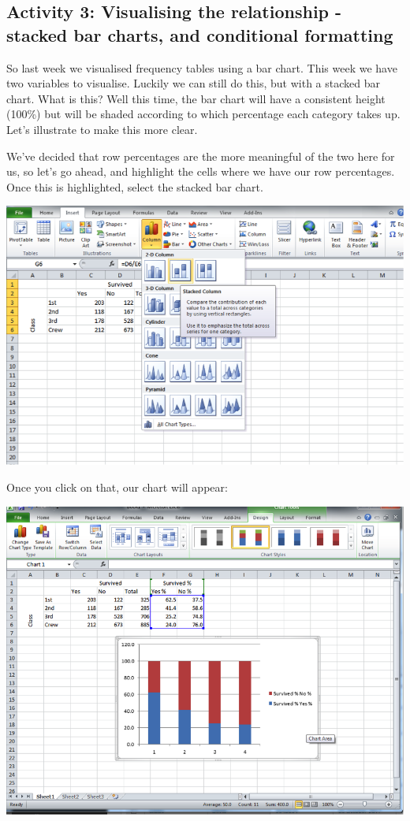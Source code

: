 \documentclass[]{book}
\theoremstyle{definition}
\theoremstyle{definition}
\theoremstyle{definition}
\theoremstyle{remark}
\begin{document}
\hypertarget{activity-3-visualising-the-relationship---stacked-bar-charts-and-conditional-formatting}{%
\subsection{Activity 3: Visualising the relationship - stacked bar
charts, and conditional
formatting}\label{activity-3-visualising-the-relationship---stacked-bar-charts-and-conditional-formatting}}

So last week we visualised frequency tables using a bar chart. This week
we have two variables to visualise. Luckily we can still do this, but
with a stacked bar chart. What is this? Well this time, the bar chart
will have a consistent height (100\%) but will be shaded according to
which percentage each category takes up. Let's illustrate to make this
more clear.

 We've decided that row percentages are the more meaningful of the two
here for us, so let's go ahead, and highlight the cells where we have
our row percentages. Once this is highlighted, select the stacked bar
chart.

\includegraphics{imgs/stacked_col.png}

Once you click on that, our chart will appear:

\includegraphics{imgs/stacked_col_2.png}
\end{document}
